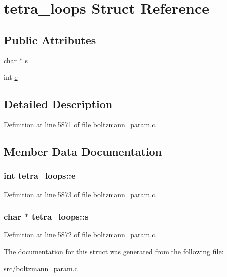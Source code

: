 \hypertarget{structtetra__loops}{\section{tetra\+\_\+loops Struct Reference}
\label{structtetra__loops}
}
\subsection*{Public Attributes}
\begin{DoxyCompactItemize}
\item 
char $\ast$ \hyperlink{structtetra__loops_a5a9ff926aa7eda504b3f011c3eeefe84}{s}
\item 
int \hyperlink{structtetra__loops_a5ab6b25e9a5fd07b656290030ed51da5}{e}
\end{DoxyCompactItemize}


\subsection{Detailed Description}


Definition at line 5871 of file boltzmann\+\_\+param.\+c.



\subsection{Member Data Documentation}
\hypertarget{structtetra__loops_a5ab6b25e9a5fd07b656290030ed51da5}{
\subsubsection[{e}]{\setlength{\rightskip}{0pt plus 5cm}int tetra\+\_\+loops\+::e}}\label{structtetra__loops_a5ab6b25e9a5fd07b656290030ed51da5}


Definition at line 5873 of file boltzmann\+\_\+param.\+c.

\hypertarget{structtetra__loops_a5a9ff926aa7eda504b3f011c3eeefe84}{
\subsubsection[{s}]{\setlength{\rightskip}{0pt plus 5cm}char $\ast$ tetra\+\_\+loops\+::s}}\label{structtetra__loops_a5a9ff926aa7eda504b3f011c3eeefe84}


Definition at line 5872 of file boltzmann\+\_\+param.\+c.



The documentation for this struct was generated from the following file\+:\begin{DoxyCompactItemize}
\item 
src/\hyperlink{boltzmann__param_8c}{boltzmann\+\_\+param.\+c}\end{DoxyCompactItemize}
